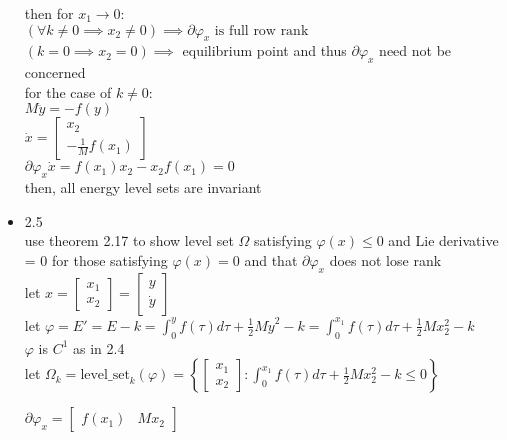 \documentclass[12pt,letter]{article}
\begin{document}
\begin{itemize}
    then for $x_1 \rightarrow 0$:\\
    $(\forall k\neq 0 \implies x_2 \neq 0) \implies \partial \varphi_x \text{ is full row rank}$\\
    $(k=0\implies x_2 = 0) \implies$ equilibrium point and thus $\partial \varphi_x$ need not be concerned\\

    for the case of $k\neq 0$:\\
    $M\ddot{y}=-f(y)$\\
    $\dot{x}=\begin{bmatrix} x_2 \\ -\frac{1}{M}f(x_1) \end{bmatrix}$\\
    $\partial \varphi_x \dot{x}=f(x_1)x_2-x_2 f(x_1)=0$\\

    then, all energy level sets are invariant\\

    \pagebreak
    
  \item 2.5\\
    use theorem 2.17 to show level set $\Omega$ satisfying $\varphi(x) \leq 0$ and Lie derivative = 0 for those satisfying $\varphi(x)=0$ and that $\partial \varphi_x$ does not lose rank\\

    let $x=\begin{bmatrix}x_1 \\ x_2 \end{bmatrix}=\begin{bmatrix}y \\ \dot{y} \end{bmatrix}$\\

    let $\varphi=E'=E-k=\int_{0}^y f(\tau) d \tau + \frac{1}{2}M \dot{y}^2-k=\int_{0}^{x_1} f(\tau) d \tau + \frac{1}{2}M x_2^2-k$\\

    $\varphi$ is $C^1$ as in 2.4\\
    
    let $\Omega_k = \text{level\_set}_{k}(\varphi) = \left\{\begin{bmatrix}x_1 \\ x_2\end{bmatrix}: \int_{0}^{x_1} f(\tau) d \tau + \frac{1}{2}M x_2^2-k \leq 0 \right\}$

    $\partial \varphi_x = \begin{bmatrix} f(x_1) & M x_2\end{bmatrix}$\\


\end{itemize}
\end{document}

